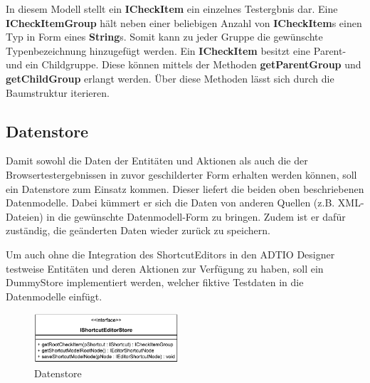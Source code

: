 In diesem Modell stellt ein \textbf{ICheckItem} ein einzelnes Testergbnis dar. Eine \textbf{ICheckItemGroup} hält neben einer beliebigen Anzahl von \textbf{ICheckItem}s einen Typ in Form eines \textbf{String}s. Somit kann zu jeder Gruppe die gewünschte Typenbezeichnung hinzugefügt werden. Ein \textbf{ICheckItem} besitzt eine Parent- und ein Childgruppe. Diese können mittels der Methoden \textbf{getParentGroup} und \textbf{getChildGroup} erlangt werden. Über diese Methoden lässt sich durch die Baumstruktur iterieren.

\vspace{-5px}

\subsection{Datenstore}

Damit sowohl die Daten der Entitäten und Aktionen als auch die der Browsertestergebnissen in zuvor geschilderter Form erhalten werden können, soll ein Datenstore zum Einsatz kommen. Dieser liefert die beiden oben beschriebenen Datenmodelle. Dabei kümmert er sich die Daten von anderen Quellen (z.B. XML-Dateien) in die gewünschte Datenmodell-Form zu bringen. Zudem ist er dafür zuständig, die geänderten Daten wieder zurück zu speichern.

Um auch ohne die Integration des ShortcutEditors in den ADTIO Designer testweise Entitäten und deren Aktionen zur Verfügung zu haben, soll ein DummyStore implementiert werden, welcher fiktive Testdaten in die Datenmodelle einfügt.

\vfill

\begin{figure}[H]
	\centering
	\includegraphics[height=70px]{../graphic/diagrams/CD_IShortcutEditorStore/IShortcutEditorStore}
	\caption{Datenstore}
	\label{fig:ishortcuteditorstore}
\end{figure}



\newpage